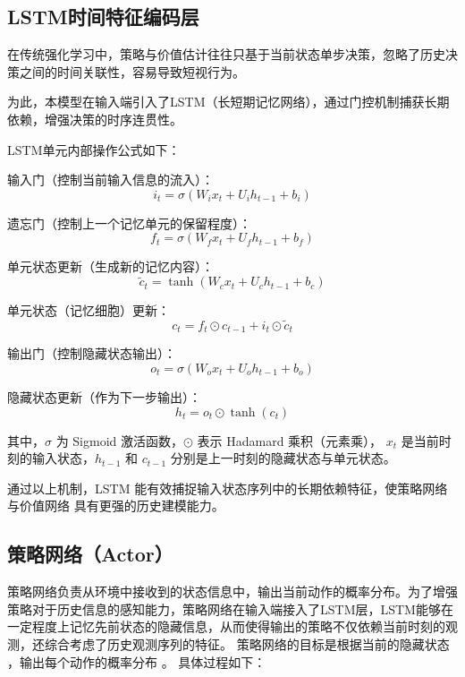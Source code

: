 \subsection{LSTM时间特征编码层}

在传统强化学习中，策略与价值估计往往只基于当前状态单步决策，忽略了历史决策之间的时间关联性，容易导致短视行为。

为此，本模型在输入端引入了LSTM（长短期记忆网络），通过门控机制捕获长期依赖，增强决策的时序连贯性。

LSTM单元内部操作公式如下：

输入门（控制当前输入信息的流入）：
\begin{equation}
i_t = \sigma(W_i x_t + U_i h_{t-1} + b_i)
\end{equation}

遗忘门（控制上一个记忆单元的保留程度）：
\begin{equation}
f_t = \sigma(W_f x_t + U_f h_{t-1} + b_f)
\end{equation}

单元状态更新（生成新的记忆内容）：
\begin{equation}
\tilde{c}_t = \tanh(W_c x_t + U_c h_{t-1} + b_c)
\end{equation}

单元状态（记忆细胞）更新：
\begin{equation}
c_t = f_t \odot c_{t-1} + i_t \odot \tilde{c}_t
\end{equation}

输出门（控制隐藏状态输出）：
\begin{equation}
o_t = \sigma(W_o x_t + U_o h_{t-1} + b_o)
\end{equation}

隐藏状态更新（作为下一步输出）：
\begin{equation}
h_t = o_t \odot \tanh(c_t)
\end{equation}

其中，$\sigma$ 为 Sigmoid 激活函数，$\odot$ 表示 Hadamard 乘积（元素乘），
$x_t$ 是当前时刻的输入状态，$h_{t-1}$ 和 $c_{t-1}$ 分别是上一时刻的隐藏状态与单元状态。

通过以上机制，LSTM 能有效捕捉输入状态序列中的长期依赖特征，使策略网络与价值网络
具有更强的历史建模能力。

\subsection{策略网络（Actor）}

策略网络负责从环境中接收到的状态信息中，输出当前动作的概率分布。为了增强策略对于历史信息的感知能力，策略网络在输入端接入了LSTM层，LSTM能够在一定程度上记忆先前状态的隐藏信息，从而使得输出的策略不仅依赖当前时刻的观测，还综合考虑了历史观测序列的特征。
策略网络的目标是根据当前的隐藏状态 ，输出每个动作的概率分布 。
具体过程如下：

